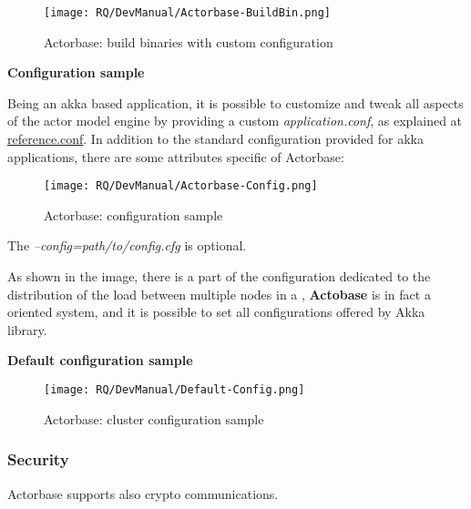 \documentclass{scalatekids-article}
\begin{document}
\begin{figure}[H]
  \begin{center}
    \texttt{[image: RQ/DevManual/Actorbase-BuildBin.png]}
    \caption{Actorbase: build binaries with custom configuration}
  \end{center}
\end{figure}

\textbf{Configuration sample}

Being an akka based application, it is possible to customize and tweak all
aspects of the actor model engine by providing a custom \textit{application.conf}, as
explained at
\href{http://doc.akka.io/docs/akka/2.4.7/general/configuration.html#Listing_of_the_Reference_Configuration}{reference.conf}.
In addition to the standard configuration provided for akka applications, there are some attributes specific
of Actorbase:

\begin{figure}[H]
  \begin{center}
    \texttt{[image: RQ/DevManual/Actorbase-Config.png]}
    \caption{Actorbase: configuration sample}
  \end{center}
\end{figure}

The \textit{--config=path/to/config.cfg} is optional.

As shown in the image, there is a part of the configuration dedicated to the
distribution of the load between multiple nodes in a , \textbf{Actobase} is in fact a
 oriented system, and it is possible to set all
 configurations offered by Akka library.

\textbf{Default configuration sample}

\begin{figure}[H]
  \begin{center}
    \texttt{[image: RQ/DevManual/Default-Config.png]}
    \caption{Actorbase: cluster configuration sample}
  \end{center}
\end{figure}

\subsubsection{Security}

Actorbase supports also crypto communications.
\end{document}
